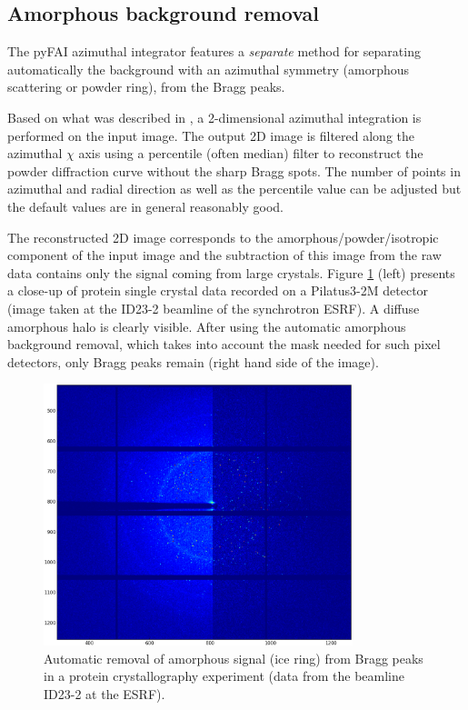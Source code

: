 \documentclass{iucr}
\begin{document}
\subsection{Amorphous background removal}

The pyFAI azimuthal integrator features a \textit{separate} method for
separating automatically the background with an azimuthal symmetry (amorphous
scattering or powder ring), from the Bragg peaks.

Based on what was described in \cite{PyFAI_PDJ}, a 2-dimensional azimuthal
integration is performed on the input image.
The output 2D image is filtered along the azimuthal $\chi$ axis using a
percentile (often median) filter to reconstruct the powder diffraction curve
without the sharp Bragg spots.
The number of points in azimuthal and radial direction as well as
the percentile value can be adjusted but the default values are in
general reasonably good.

The reconstructed 2D image corresponds to the amorphous/powder/isotropic
component of the input image and the subtraction of this image from
the raw data contains only the signal coming from large crystals.
Figure \ref{separate} (left)
presents a close-up of protein single crystal data recorded on a Pilatus3-2M
detector (image taken at the ID23-2 beamline of the synchrotron ESRF).
A diffuse amorphous halo is clearly visible.
After using the automatic amorphous background removal, which takes into account
the mask needed for such pixel detectors, only Bragg peaks remain (right hand
side of the image).

\begin{figure}
\label{separate}
\begin{center}
\includegraphics[width=9cm]{separate_id23.eps}
\caption{Automatic removal of amorphous signal (ice ring) from Bragg peaks in a
protein crystallography experiment (data from the beamline ID23-2 at
the ESRF).}
\end{center}
\end{figure}
\end{document}
